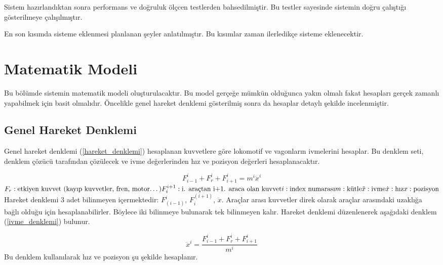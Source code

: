 \documentclass[10pt,a4paper]{article}
\begin{document}
Sistem hazırlandıktan sonra performans ve doğruluk ölçcen testlerden bahsedilmiştir. Bu testler sayesinde sistemin doğru çalıştığı gösterilmeye çalışılmıştır. 

En son kısımda sisteme eklenmesi planlanan şeyler anlatılmıştır. Bu kısımlar zaman ilerledikçe sisteme eklenecektir.

  
\newpage

\section{Matematik Modeli}

Bu bölümde sistemin matematik modeli oluşturulacaktır. Bu model gerçeğe mümkün olduğunca yakın olmalı fakat hesapları gerçek zamanlı yapabilmek için basit olmalıdır. Öncelikle genel hareket denklemi gösterilmiş sonra da hesaplar detaylı şekilde incelenmiştir.


\subsection{Genel Hareket Denklemi}
Genel hareket denklemi (\ref{hareket_denklemi}) hesaplanan kuvvetlere göre lokomotif ve vagonların ivmelerini hesaplar.  Bu denklem seti, denklem çözücü tarafından çözülecek ve ivme değerlerinden hız ve pozisyon değerleri hesaplanacaktır.

\begin{equation}
\label{hareket_denklemi}
F_{i-1}^{i}+F_r^i  + F_{i+1}^i = m^i\ddot{x}^i
\end{equation}
$\newline
F_r: \text{etkiyen kuvvet (kayıp kuvvetler, fren, motor\ldots)} \\
F_i^{i+1}: \text{i. araçtan i+1. araca olan kuvvet} \\
i: \text{index numarası} \\
m: \text{kütle} \\
\ddot{x}: \text{ivme} \\
\dot{x}: \text{hız}\\
x: \text{pozisyon}\\
$
Hareket denklemi 3 adet bilinmeyen içermektedir: $F_(i-1)^i$, $F_i^(i+1)$, $\ddot{x}$. Araçlar arası kuvvetler direk olarak araçlar arasındaki uzaklığa bağlı olduğu için hesaplanabilirler. Böylece iki bilinmeye bulunarak tek bilinmeyen kalır. Hareket denklemi düzenlenerek aşağıdaki denklem (\ref{ivme_denklemi}) bulunur.

\begin{equation}
\label{ivme_denklemi}
\ddot{x}^i=\dfrac{F_{i-1}^{i}+F_r^i+F_{i+1}^{i}}{m^i}
\end{equation}
Bu denklem kullanılarak hız ve pozisyon şu şekilde hesaplanır.
\end{document}
